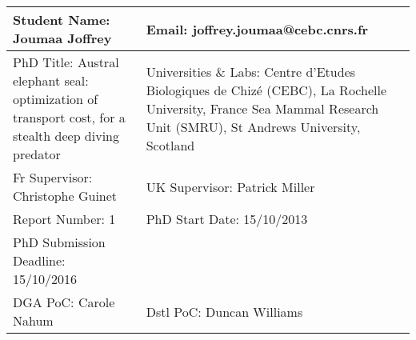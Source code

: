\documentclass[12pt,a4paper]{report}
\begin{document}
    \begin{tabular}{M{8cm}|M{8cm}}
    \toprule
    Student Name: Joumaa Joffrey & Email: joffrey.joumaa@cebc.cnrs.fr  \tabularnewline \midrule
    PhD Title: Austral elephant seal: optimization of transport cost, for a stealth deep diving predator & Universities \& Labs: Centre d’Etudes Biologiques de Chizé (CEBC), La Rochelle University, France  Sea Mammal Research Unit (SMRU), St Andrews University, Scotland \tabularnewline \midrule
    Fr   Supervisor: Christophe Guinet & UK   Supervisor: Patrick Miller \tabularnewline \midrule
    Report   Number: 1 & PhD Start Date: 15/10/2013  \\
    PhD Submission Deadline: 15/10/2016 \tabularnewline \midrule
    DGA   PoC: Carole Nahum & Dstl   PoC: Duncan Williams \tabularnewline \bottomrule
    \end{tabular}
\end{document}
